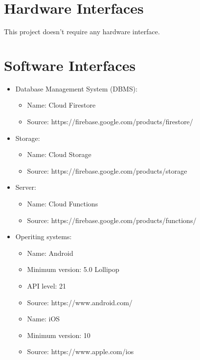 \section{Hardware Interfaces}
This project doesn’t require any hardware interface.
\section{Software Interfaces}
\begin{itemize}
    \item Database Management System (DBMS):
    \begin{itemize}
        \item 
        Name: Cloud Firestore
        \item 
        Source: https://firebase.google.com/products/firestore/
    \end{itemize}
    \item Storage:
    \begin{itemize}
        \item 
        Name: Cloud Storage
        \item 
        Source: https://firebase.google.com/products/storage
    \end{itemize}
    \item Server:
    \begin{itemize}
        \item 
        Name: Cloud Functions
        \item 
        Source: https://firebase.google.com/products/functions/
    \end{itemize}
    \item
    Operiting systems:
    \begin{itemize}
        \item 
        Name: Android
        \item 
        Minimum version: 5.0 Lollipop 
        \item 
        API level: 21
        \item 
        Source: https://www.android.com/\\ 
        \item 
        Name: iOS
        \item 
        Minimum version: 10
        \item 
        Source: https://www.apple.com/ios
    \end{itemize}
\end{itemize}
